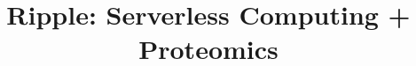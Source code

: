 \documentclass[10pt, twocolumn]{article}
\title{Ripple: Serverless Computing + Proteomics}
\date{}
\begin{document}
\maketitle

\begin{sloppypar}

%

%

%
%
%
%

%
%
%
\vspace{-0.15in}
\end{sloppypar}


\clearpage %
{


}
\end{document}
